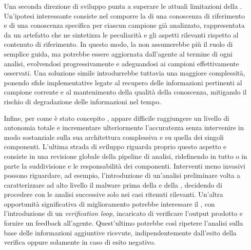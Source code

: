 Una seconda direzione di sviluppo punta a superare le attuali limitazioni della \kb{}. Un'ipotesi interessante consiste nel comporre la \kb{} di una conoscenza di riferimento e di una conoscenza specifica per ciascun campione già analizzato, rappresentata da un artefatto che ne sintetizza le peculiarità e gli aspetti rilevanti rispetto al contenuto di riferimento. In questo modo, la \kb{} non assumerebbe più il ruolo di semplice guida, ma potrebbe essere aggiornata dall'agente al termine di ogni analisi, evolvendosi progressivamente e adeguandosi ai campioni effettivamente osservati. Una soluzione simile introdurrebbe tuttavia una maggiore complessità, ponendo sfide implementative legate al recupero delle informazioni pertinenti al campione corrente e al mantenimento della qualità della conoscenza, mitigando il rischio di degradazione delle informazioni nel tempo.

Infine, per come è stato concepito \system{}, appare difficile raggiungere un livello di autonomia totale e incrementare ulteriormente l'accuratezza senza intervenire in modo sostanziale sulla sua architettura complessiva e su quella dei singoli componenti. L'ultima strada di sviluppo riguarda proprio questo aspetto e consiste in una revisione globale della pipeline di analisi, ridefinendo in tutto o in parte la suddivisione e le responsabilità dei componenti. Interventi meno invasivi possono riguardare, ad esempio, l'introduzione di un'analisi preliminare volta a caratterizzare ad alto livello il malware prima della \renaming{} e della \reversing{}, decidendo di procedere con le analisi successive solo nei casi ritenuti rilevanti. Un'altra opportunità significativa di miglioramento potrebbe interessare il \sreagent{}, con l'introduzione di un \emph{verification loop}, incaricato di verificare l'output prodotto e fornire un feedback all'agente. Quest'ultimo potrebbe così ripetere l'analisi sulla base delle informazioni aggiuntive ricevute, indipendentemente dall'esito della verifica oppure solamente in caso di esito negativo.



